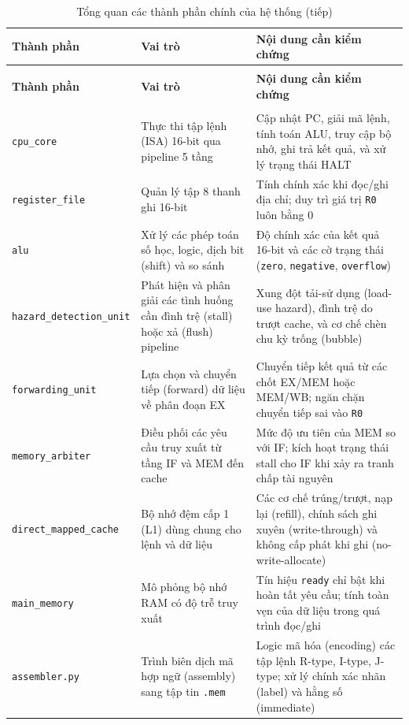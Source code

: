 \documentclass[11pt,a4paper]{article}
\theoremstyle{definition}
\theoremstyle{remark}
\begin{document}
	{\footnotesize
		\begin{longtable}[c]{@{} >{\RaggedRight\arraybackslash}p{4.05cm} >{\RaggedRight\arraybackslash}p{4.65cm} >{\RaggedRight\arraybackslash}p{5.0cm} @{}}
			\caption{Tổng quan các thành phần chính của hệ thống}\\
			\toprule
			\textbf{Thành phần} & \textbf{Vai trò} & \textbf{Nội dung cần kiểm chứng} \\
			\midrule
			\endfirsthead
			\caption[]{Tổng quan các thành phần chính của hệ thống (tiếp)}\\
			\toprule
			\textbf{Thành phần} & \textbf{Vai trò} & \textbf{Nội dung cần kiểm chứng} \\
			\midrule
			\endhead
			\midrule
			\multicolumn{3}{r}{\small\itshape(tiếp trang sau)} \\
			\endfoot
			\bottomrule
			\endlastfoot
			\texttt{cpu\_core} & Thực thi tập lệnh (ISA) 16-bit qua pipeline 5 tầng & Cập nhật PC, giải mã lệnh, tính toán ALU, truy cập bộ nhớ, ghi trả kết quả, và xử lý trạng thái HALT \\
			\texttt{register\_file} & Quản lý tập 8 thanh ghi 16-bit & Tính chính xác khi đọc/ghi địa chỉ; duy trì giá trị \texttt{R0} luôn bằng 0 \\
			\texttt{alu} & Xử lý các phép toán số học, logic, dịch bit (shift) và so sánh & Độ chính xác của kết quả 16-bit và các cờ trạng thái (\texttt{zero}, \texttt{negative}, \texttt{overflow}) \\
			\texttt{hazard\_detection\_unit} & Phát hiện và phân giải các tình huống cần đình trệ (stall) hoặc xả (flush) pipeline & Xung đột tải-sử dụng (load-use hazard), đình trệ do trượt cache, và cơ chế chèn chu kỳ trống (bubble) \\
			\texttt{forwarding\_unit} & Lựa chọn và chuyển tiếp (forward) dữ liệu về phân đoạn EX & Chuyển tiếp kết quả từ các chốt EX/MEM hoặc MEM/WB; ngăn chặn chuyển tiếp sai vào \texttt{R0} \\
			\texttt{memory\_arbiter} & Điều phối các yêu cầu truy xuất từ tầng IF và MEM đến cache & Mức độ ưu tiên của MEM so với IF; kích hoạt trạng thái stall cho IF khi xảy ra tranh chấp tài nguyên \\
			\texttt{direct\_mapped\_cache} & Bộ nhớ đệm cấp 1 (L1) dùng chung cho lệnh và dữ liệu & Các cơ chế trúng/trượt, nạp lại (refill), chính sách ghi xuyên (write-through) và không cấp phát khi ghi (no-write-allocate) \\
			\texttt{main\_memory} & Mô phỏng bộ nhớ RAM có độ trễ truy xuất & Tín hiệu \texttt{ready} chỉ bật khi hoàn tất yêu cầu; tính toàn vẹn của dữ liệu trong quá trình đọc/ghi \\
			\texttt{assembler.py} & Trình biên dịch mã hợp ngữ (assembly) sang tập tin \texttt{.mem} & Logic mã hóa (encoding) các tập lệnh R-type, I-type, J-type; xử lý chính xác nhãn (label) và hằng số (immediate) \\
		\end{longtable}
	}
	
\end{document}

